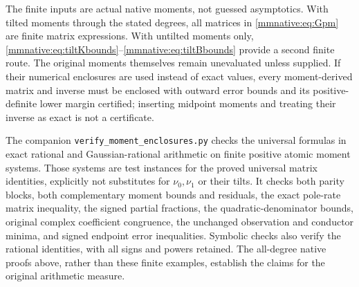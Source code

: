 \documentclass[11pt]{article}
\begin{document}
The finite inputs are actual native moments, not guessed asymptotics.
With tilted moments through the stated degrees, all matrices in
\eqref{mmnative:eq:Gpm} are finite matrix expressions.  With untilted moments
only, \eqref{mmnative:eq:tiltKbounds}--\eqref{mmnative:eq:tiltBbounds} provide a second
finite route.  The original moments themselves remain unevaluated
unless supplied.  If their numerical enclosures are used instead of
exact values, every moment-derived matrix and inverse must be enclosed
with outward error bounds and its positive-definite lower margin
certified; inserting midpoint moments and treating their inverse as
exact is not a certificate.

The companion \texttt{verify\_moment\_enclosures.py} checks the
universal formulas in exact rational and Gaussian-rational arithmetic
on finite positive atomic moment systems.  Those systems are test
instances for the proved universal matrix identities, explicitly not
substitutes for $\nu_0,\nu_1$ or their tilts.  It checks both parity
blocks, both complementary moment bounds and residuals, the exact
pole-rate matrix inequality, the signed partial fractions, the
quadratic-denominator bounds, original complex coefficient congruence,
the unchanged observation and conductor minima, and signed endpoint
error inequalities.  Symbolic checks also verify the rational
identities, with all signs and powers retained.  The all-degree native
proofs above, rather than these finite examples, establish the claims
for the original arithmetic measure.
\end{document}
